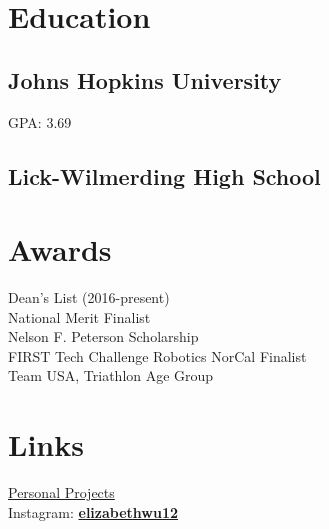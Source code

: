 \documentclass[]{deedy-resume}
\begin{document}
%
%

%
%

%
%

\begin{minipage}[t]{0.3\textwidth}


\section{Education} 

\subsection{Johns Hopkins University}
GPA: 3.69
\sectionsep

\subsection{Lick-Wilmerding High School}
\sectionsep


\section{Awards}
Dean's List (2016-present)\\
National Merit Finalist\\
Nelson F. Peterson Scholarship\\
FIRST Tech Challenge Robotics NorCal Finalist\\
Team USA, Triathlon Age Group
\sectionsep


\section{Links} 
\underline{Personal Projects}\\
Instagram: \href{https://www.instagram.com/elizabethwu12/}{\bf elizabethwu12} \\


\end{minipage}
\end{document}
